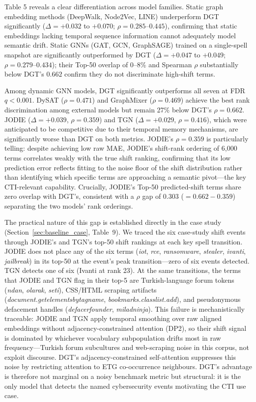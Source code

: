 \documentclass[12pt]{article}
\begin{document}
Table 5 reveals a clear differentiation across model families. Static graph embedding methods (DeepWalk, Node2Vec, LINE) underperform DGT significantly ($\Delta = +0.032$ to $+0.070$; $\rho = 0.285$--$0.445$), confirming that static embeddings lacking temporal sequence information cannot adequately model semantic drift. Static GNNs (GAT, GCN, GraphSAGE) trained on a single-spell snapshot are significantly outperformed by DGT ($\Delta = +0.047$ to $+0.049$; $\rho = 0.279$--$0.434$); their Top-50 overlap of 0--8\% and Spearman $\rho$ substantially below DGT's $0.662$ confirm they do not discriminate high-shift terms.

Among dynamic GNN models, DGT significantly outperforms all seven at FDR $q < 0.001$. DySAT ($\rho = 0.471$) and GraphMixer ($\rho = 0.469$) achieve the best rank discrimination among external models but remain 27\% below DGT's $\rho = 0.662$. JODIE ($\Delta = +0.039$, $\rho = 0.359$) and TGN ($\Delta = +0.029$, $\rho = 0.416$), which were anticipated to be competitive due to their temporal memory mechanisms, are significantly worse than DGT on both metrics. JODIE's $\rho = 0.359$ is particularly telling: despite achieving low raw MAE, JODIE's shift-rank ordering of 6,000 terms correlates weakly with the true shift ranking, confirming that its low prediction error reflects fitting to the noise floor of the shift distribution rather than identifying which specific terms are approaching a semantic pivot---the key CTI-relevant capability. Crucially, JODIE's Top-50 predicted-shift terms share zero overlap with DGT's, consistent with a $\rho$ gap of $0.303$ ($= 0.662 - 0.359$) separating the two models' rank orderings.

The practical nature of this gap is established directly in the case study (Section~\ref{sec:baseline_case}, Table~9). We traced the six case-study shift events through JODIE's and TGN's top-50 shift rankings at each key spell transition. JODIE does not place any of the six terms (\textit{iot}, \textit{rce}, \textit{ransomware}, \textit{stealer}, \textit{ivanti}, \textit{jailbreak}) in its top-50 at the event's peak transition---zero of six events detected. TGN detects one of six (Ivanti at rank 23). At the same transitions, the terms that JODIE and TGN flag in their top-5 are Turkish-language forum tokens (\textit{ndan}, \textit{olarak}, \textit{seti}), CSS/HTML scraping artifacts (\textit{document.getelementsbytagname}, \textit{bookmarks.classlist.add}), and pseudonymous defacement handles (\textit{defacerfounder}, \textit{miladninja}). This failure is mechanistically traceable: JODIE and TGN apply temporal smoothing over raw aligned embeddings without adjacency-constrained attention (DP2), so their shift signal is dominated by whichever vocabulary subpopulation drifts most in raw frequency---Turkish forum subcultures and web-scraping noise in this corpus, not exploit discourse. DGT's adjacency-constrained self-attention suppresses this noise by restricting attention to ETG co-occurrence neighbours. DGT's advantage is therefore not marginal on a noisy benchmark metric but structural: it is the only model that detects the named cybersecurity events motivating the CTI use case.
\end{document}
